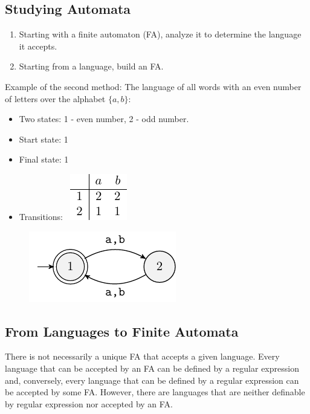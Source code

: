 \subsection{Studying Automata}
\begin{enumerate}
    \item Starting with a finite automaton (FA), analyze it to determine the language it accepts.
    \item Starting from a language, build an FA.
\end{enumerate}
Example of the second method: The language of all words with an even number of letters over the alphabet \(\{a,b\}\):
\begin{itemize}
    \item Two states: 1 - even number, 2 - odd number.
    \item Start state: 1
    \item Final state: 1
    \item Transitions: \ \includegraphics[width=0.2\linewidth]{lectures/figures/5-2transitions.pdf}
\end{itemize}
\begin{figure}[h!]
    \centering
    \includegraphics[width=0.4\linewidth]{lectures/figures/5-2fa.pdf}
\end{figure}

\subsection{From Languages to Finite Automata}
There is not necessarily a unique FA that accepts a given language.
Every language that can be accepted by an FA can be defined by a regular expression and, conversely, every language that can be defined by a regular expression can be accepted by some FA.
However, there are languages that are neither definable by regular expression nor accepted by an FA.
\newpage
